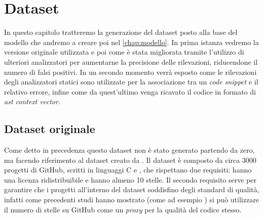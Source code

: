 \chapter{Dataset}\label{chap:dataset}
In questo capitolo tratteremo la generazione del dataset posto alla base del modello che andremo a creare poi nel \autoref{chap:modello}. 
In prima istanza vedremo la versione originale utilizzata e poi come è stata migliorata tramite l'utilizzo di ulteriori analizzatori per aumentarne la precisione delle rilevazioni, riducendone il numero di falsi positivi.
In un secondo momento verrà esposto come le rilevazioni degli analizzatori statici sono utilizzate per la associazione tra un \textit{code snippet} e il relativo errore, infine come da quest'ultimo venga ricavato il codice in formato di \textit{ast context vector}.

\section{Dataset originale}
Come detto in precedenza questo dataset non è stato generato partendo da zero, ma facendo riferimento al dataset creato da \cite{gelman2019source}. Il dataset è composto da circa 3000 progetti di GitHub, scritti in linguaggi C e \CPP,
 che rispettano due requisiti: hanno una licenza ridistribuibile e hanno almeno 10 stelle.
 Il secondo requisito serve per garantire che i progetti all'interno del dataset soddisfino degli standard di qualità, infatti come precedenti studi hanno mostrato (come ad esempio \cite{papamichail2016user}) si può utilizzare il numero
 di stelle su GitHub come un \textit{proxy} per la qualità del codice stesso.

